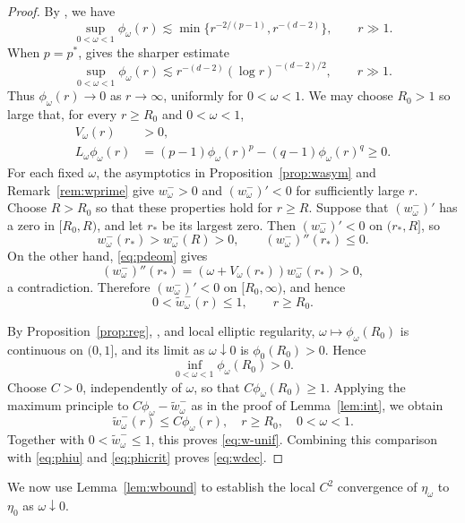 \documentclass[12pt, a4paper, reqno]{amsart}
\numberwithin{equation}{section}
\theoremstyle{definition}
\theoremstyle{remark}
\begin{document}
\begin{proof}
By \cite[Proposition~3.5]{FH21}, we have
\begin{equation}\label{eq:phiu}
  \sup_{0<\omega<1}\phi_\omega(r)
  \lesssim\min\{r^{-2/(p-1)},r^{-(d-2)}\},
  \qquad r\gg1.
\end{equation}
When $p=p^*$, \cite[Proposition~3.7]{FH21} gives the sharper estimate
\begin{equation}\label{eq:phicrit}
  \sup_{0<\omega<1}\phi_\omega(r)
  \lesssim r^{-(d-2)}(\log r)^{-(d-2)/2},
  \qquad r\gg1.
\end{equation}
Thus $\phi_\omega(r)\to0$ as $r\to\infty$, uniformly for
$0<\omega<1$. We may
choose $R_0>1$ so large that, for every $r\ge R_0$ and
$0<\omega<1$,
\begin{align*}
  V_\omega(r)&>0,\\
  L_\omega\phi_\omega(r)
    &=(p-1)\phi_\omega(r)^p-(q-1)\phi_\omega(r)^q\ge0.
\end{align*}
For each fixed $\omega$, the asymptotics in
Proposition~\ref{prop:wasym} and Remark~\ref{rem:wprime} give
$w_\omega^->0$ and $(w_\omega^-)'<0$ for sufficiently large $r$.
Choose $R>R_0$ so that these properties hold for $r\ge R$.
Suppose that $(w_\omega^-)'$ has a zero in $[R_0,R)$,
and let $r_*$ be its largest zero.
Then $(w_\omega^-)'<0$ on $(r_*,R]$, so
\[
  w_\omega^-(r_*)>w_\omega^-(R)>0,
  \qquad
  (w_\omega^-)''(r_*)\le0.
\]
On the other hand, \eqref{eq:pdeom} gives
\[
  (w_\omega^-)''(r_*)
  =(\omega+V_\omega(r_*))w_\omega^-(r_*)>0,
\]
a contradiction.
Therefore $(w_\omega^-)'<0$ on $[R_0,\infty)$,
and hence
\[
  0<\widetilde w_\omega^-(r)\le1,
  \qquad r\ge R_0.
\]

By Proposition~\ref{prop:reg}, \cite[Theorem~1.6]{FH21}, and local
elliptic regularity, $\omega\mapsto\phi_\omega(R_0)$ is continuous
on $(0,1]$, and its limit as $\omega\downarrow0$ is $\phi_0(R_0)>0$. Hence
\[
  \inf_{0<\omega<1}\phi_\omega(R_0)>0.
\]
Choose $C>0$, independently of $\omega$, so that
$C\phi_\omega(R_0)\ge1$. Applying the maximum principle to
$C\phi_\omega-\widetilde w_\omega^-$ as in the proof of
Lemma~\ref{lem:int}, we obtain
\[
  \widetilde w_\omega^-(r)\le C\phi_\omega(r),
  \quad r\ge R_0,\quad 0<\omega<1.
\]
Together with $0<\widetilde w_\omega^-\le1$, this proves
\eqref{eq:w-unif}. Combining this comparison with \eqref{eq:phiu}
and \eqref{eq:phicrit} proves \eqref{eq:wdec}.
\end{proof}

We now use Lemma~\ref{lem:wbound} to establish the local $C^2$ convergence of $\eta_\omega$ to $\eta_0$ as $\omega\downarrow0$.
\end{document}
